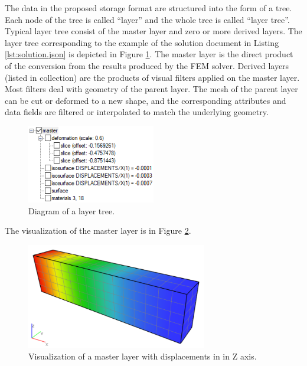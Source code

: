 The data in the proposed storage format are structured into the form of a tree. Each node of the tree is called ``layer'' and the whole tree is called ``layer tree''. Typical layer tree consist of the master layer and zero or more derived layers. The layer tree corresponding to the example of the solution document in Listing \ref{lst:solution.json} is depicted in Figure \ref{fig:layers-tree}. The master layer is the direct product of the conversion from the results produced by the FEM solver. Derived layers (listed in  collection) are the products of visual filters applied on the master layer. Most filters deal with geometry of the parent layer. The mesh of the parent layer can be cut or deformed to a new shape, and the corresponding attributes and data fields are filtered or interpolated to match the underlying geometry.

\begin{figure}[H]
    \centering
    \includegraphics[width=0.5\textwidth]{figures/chapter-data-management/layers-tree-diagram}
    \decoRule
    \caption{Diagram of a layer tree.}
    \label{fig:layers-tree}
\end{figure}

The visualization of the master layer is in Figure \ref{fig:beam-master-layer}.

\begin{figure}[H]
    \centering
    \includegraphics[width=0.7\textwidth]{figures/chapter-data-management/beam-master-layer}
    \decoRule
    \caption[Visualization of a master layer]{Visualization of a master layer with displacements in in Z axis.}
    \label{fig:beam-master-layer}
\end{figure}

